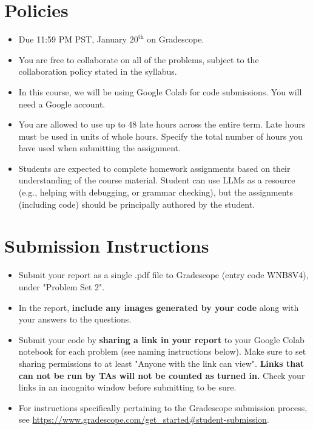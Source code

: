 \documentclass{article}
\begin{document}
\pagestyle{fancy}




\section*{Policies}
\begin{itemize}
	\item Due 11:59 PM PST, January $20^\text{th}$ on Gradescope. 
	\item You are free to collaborate on all of the problems, subject to the collaboration policy stated in the syllabus.
	\item In this course, we will be using Google Colab for code submissions. You will need a Google account.
    \item You are allowed to use up to 48 late hours across the entire term. Late hours must be used in units of whole hours. Specify the total number of hours you have used when submitting the assignment.
    \item Students are expected to complete homework assignments based on their understanding of the course material. Student can use LLMs as a resource (e.g., helping with debugging, or grammar checking), but the assignments (including code) should be principally authored by the student.
\end{itemize}

\section*{Submission Instructions}
\begin{itemize}
	\item Submit your report as a single .pdf file to Gradescope (entry code WNB8V4), under "Problem Set 2". 
	\item In the report, \textbf{include any images generated by your code} along with your answers to the questions.
	\item Submit your code by \textbf{sharing a link in your report} to your Google Colab notebook for each problem (see naming instructions below). Make sure to set sharing permissions to at least "Anyone with the link can view". \textbf{Links that can not be run by TAs will not be counted as turned in.} Check your links in an incognito window before submitting to be sure. 
	\item For instructions specifically pertaining to the Gradescope submission process, see \url{https://www.gradescope.com/get_started#student-submission}.
\end{itemize}
\end{document}
